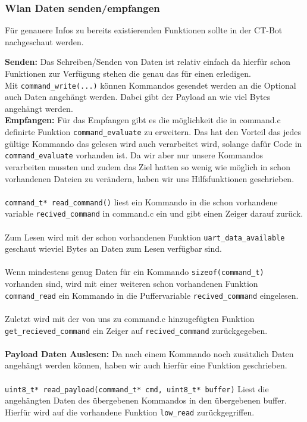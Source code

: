 \subsubsection{Wlan Daten senden/empfangen}
\label{wlan_funktionen}

Für genauere Infos zu bereits existierenden Funktionen sollte in der CT-Bot nachgeschaut werden.

\textbf{Senden:} Das Schreiben/Senden von Daten ist relativ einfach da hierfür schon Funktionen zur Verfügung stehen die genau das für einen erledigen.\\
Mit \verb|command_write(...)| können Kommandos gesendet werden an die Optional auch Daten angehängt werden. Dabei gibt der Payload an wie viel Bytes angehängt werden. 
\\
\textbf{Empfangen:} Für das Empfangen gibt es die möglichkeit die in command.c definirte Funktion \verb|command_evaluate| zu erweitern. Das hat den Vorteil das jedes gültige Kommando das gelesen wird auch verarbeitet wird, solange dafür Code in \verb|command_evaluate| vorhanden ist.
Da wir aber nur unsere Kommandos verarbeiten mussten und zudem das Ziel hatten so wenig wie möglich in schon vorhandenen Dateien zu verändern, haben wir uns Hilfsfunktionen geschrieben.\\
\\
\verb|command_t* read_command()| liest ein Kommando in die schon vorhandene variable \verb|recived_command| in command.c ein und gibt einen Zeiger darauf zurück.\\
\\
Zum Lesen wird mit der schon vorhandenen Funktion \verb|uart_data_available| geschaut wieviel Bytes an Daten zum Lesen verfügbar sind.\\
\\
Wenn mindestens genug Daten für ein Kommando \verb|sizeof(command_t)| vorhanden sind, wird mit einer weiteren schon vorhandenen Funktion \verb|command_read| ein Kommando in die Puffervariable \verb|recived_command| eingelesen.\\
\\
Zuletzt wird mit der von uns zu command.c hinzugefügten Funktion \verb|get_recieved_command| ein Zeiger auf \verb|recived_command| zurückgegeben.\\
\\
\textbf{Payload Daten Auslesen:} Da nach einem Kommando noch zusätzlich Daten angehängt werden können, haben wir auch hierfür eine Funktion geschrieben.\\
\\
\verb|uint8_t* read_payload(command_t* cmd, uint8_t* buffer)| Liest die angehängten Daten des übergebenen Kommandos in den übergebenen buffer.\\ Hierfür wird auf die vorhandene Funktion \verb|low_read| zurückgegriffen.
\\


